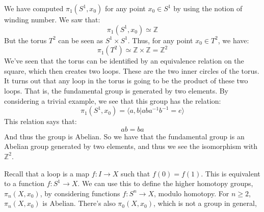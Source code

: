 \documentclass[crop=false,class=book,oneside]{standalone}
\begin{document}
            \begin{lexample}
                We have computed $\pi_{1}(S^{1},x_{0})$ for any
                point $x_{0}\in{S}^{1}$ by using the notion of
                winding number. We saw that:
                \begin{equation}
                    \pi_{1}(S^{1},x_{0})\simeq\mathbb{Z}
                \end{equation}
                But the torus $T^{2}$ can be seen as
                $S^{1}\times{S}^{1}$. Thus, for any point
                $x_{0}\in{T}^{2}$, we have:
                \begin{equation}
                    \pi_{1}(T^{2})\simeq
                    \mathbb{Z}\times\mathbb{Z}
                    =\mathbb{Z}^{2}
                \end{equation}
                We've seen that the torus can be identified by
                an equivalence relation on the square, which then
                creates two loops. These are the two inner circles
                of the torus. It turns out that any loop in the
                torus is going to be the product of these two loops.
                That is, the fundamental group is generated by
                two elements. By considering a trivial example,
                we see that this group has the relation:
                \begin{equation}
                    \pi_{1}(S^{1},x_{0})=
                    \langle{a,b}|aba^{-1}b^{-1}=e\rangle
                \end{equation}
                This relation says that:
                \begin{equation}
                    ab=ba
                \end{equation}
                And thus the group is Abelian. So we have that
                the fundamental group is an Abelian group
                generated by two elements, and thus we see the
                isomorphism with $\mathbb{Z}^{2}$.
            \end{lexample}
            Recall that a loop is a map $f:I\rightarrow{X}$
            such that $f(0)=f(1)$. This is equivalent to a
            function $f:S^{1}\rightarrow{X}$. We can use this to
            define the higher homotopy groups, $\pi_{n}(X,x_{0})$,
            by considering functions $f:S^{n}\rightarrow{X}$,
            modulo homotopy. For $n\geq{2}$,
            $\pi_{n}(X,x_{0})$ is Abelian. There's also
            $\pi_{0}(X,x_{0})$, which is not a group in general,
\end{document}
